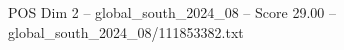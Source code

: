 \begin{textsample}{POS Dim 2 – global\_south\_2024\_08 – Score 29.00 – global\_south\_2024\_08/111853382.txt}
\end{textsample}
